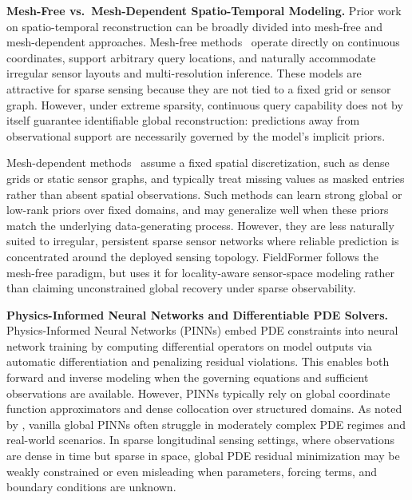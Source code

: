 \noindent\textbf{Mesh-Free vs.\ Mesh-Dependent Spatio-Temporal Modeling.}
Prior work on spatio-temporal reconstruction can be broadly divided into mesh-free and mesh-dependent approaches. Mesh-free methods~\citep{tancik2020fourier,sitzmann2020implicit,raissi2019physics,cressie1990origins,hensman2013gaussian} operate directly on continuous coordinates, support arbitrary query locations, and naturally accommodate irregular sensor layouts and multi-resolution inference. These models are attractive for sparse sensing because they are not tied to a fixed grid or sensor graph. However, under extreme sparsity, continuous query capability does not by itself guarantee identifiable global reconstruction: predictions away from observational support are necessarily governed by the model's implicit priors.

Mesh-dependent methods~\citep{nie2024imputeformer,iyer2022modeling,xu2020spatial,wu2019graph,liu2023physics,liang2024higher,santos2023development,zhao2024recfno,li2020fourier,rahman2022u,li2017diffusion} assume a fixed spatial discretization, such as dense grids or static sensor graphs, and typically treat missing values as masked entries rather than absent spatial observations. Such methods can learn strong global or low-rank priors over fixed domains, and may generalize well when these priors match the underlying data-generating process. However, they are less naturally suited to irregular, persistent sparse sensor networks where reliable prediction is concentrated around the deployed sensing topology. FieldFormer follows the mesh-free paradigm, but uses it for locality-aware sensor-space modeling rather than claiming unconstrained global recovery under sparse observability.

\noindent\textbf{Physics-Informed Neural Networks and Differentiable PDE Solvers.}
Physics-Informed Neural Networks (PINNs) \citep{raissi2019physics} embed PDE constraints into neural network training by computing differential operators on model outputs via automatic differentiation and penalizing residual violations. This enables both forward and inverse modeling when the governing equations and sufficient observations are available. However, PINNs typically rely on global coordinate function approximators and dense collocation over structured domains. As noted by \citet{krishnapriyan2021characterizing}, vanilla global PINNs often struggle in moderately complex PDE regimes and real-world scenarios. In sparse longitudinal sensing settings, where observations are dense in time but sparse in space, global PDE residual minimization may be weakly constrained or even misleading when parameters, forcing terms, and boundary conditions are unknown.

